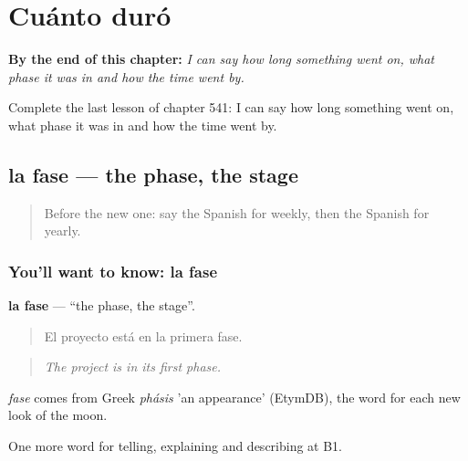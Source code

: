
\chapter{Cuánto duró}
\label{ch:es-cuanto-duro}

\begin{chapteropening}
\textbf{By the end of this chapter:} \emph{I can say how long something went on, what phase it was in and how the time went by.}

Complete the last lesson of chapter 541: I can say how long something went on, what phase it was in and how the time went by.
\end{chapteropening}

\section[la fase]{la fase — the phase, the stage}

\label{lesson:ES-C541-fase}



\begin{quote}
Before the new one: say the Spanish for weekly, then the Spanish for yearly.
\end{quote}

\subsection*{You'll want to know: la fase}
\textbf{la fase} — \textquotedblleft{}the phase, the stage\textquotedblright{}.

\begin{quote}
El proyecto está en la primera fase.
\end{quote}

\begin{quote}
\emph{The project is in its first phase.}
\end{quote}

\begin{cousinweb}
\emph{fase} comes from Greek \emph{phásis} 'an appearance' (EtymDB), the word for each new look of the moon.
\end{cousinweb}

\begin{grammarlens}[title={What you've built}]
One more word for telling, explaining and describing at B1.
\end{grammarlens}

